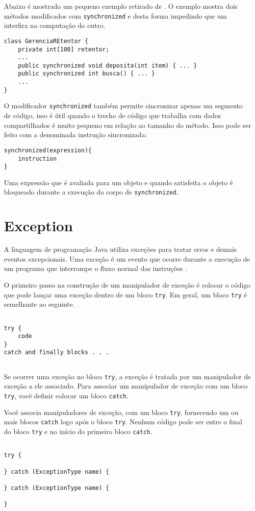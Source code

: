 Abaixo é mostrado um pequeno exemplo retirado de \cite{sebesta}. O exemplo
mostra dois métodos modificados com \texttt{synchronized} e desta forma
impedindo que um interfira na computação do outro.

\begin{lstlisting}
class GerenciaREtentor {
    private int[100] retentor;
    ...
    public synchronized void deposita(int item) { ... }
    public synchronized int busca() { ... }
    ...
}
\end{lstlisting}

O modificador \texttt{synchronized} também permite sincronizar apenas um
segmento de código, isso é útil quando o trecho de código que trabalha com
dados compartilhados é muito pequeno em relação ao tamanho do método. Isso
pode ser feito com a denominada instrução sincronizada:

\begin{lstlisting}
synchronized(expression){
    instruction
}
\end{lstlisting}

Uma expressão que é avaliada para um objeto e quando
satisfeita o objeto é bloqueado durante a execução do corpo de
\texttt{synchronized}.

\section{Exception}

A linguagem de programação Java utiliza exceções para tratar erros e
demais eventos excepcionais. Uma exceção é um evento que ocorre durante
a execução de um programa que interrompe o fluxo normal das instruções
\cite{except}.

O primeiro passo na construção de um manipulador de exceção é colocar
o código que pode lançar uma exceção dentro de um bloco \texttt{try}. Em geral,
um bloco \texttt{try} é semelhante ao seguinte.

\begin{lstlisting}

try {
    code
}
catch and finally blocks . . .
    
\end{lstlisting}


Se ocorrer uma exceção no bloco \texttt{try}, a exceção é tratada por um
manipulador de exceção a ele associado. Para associar um manipulador de
exceção com um bloco \texttt{try}, você definir colocar um bloco
\texttt{catch}.

Você associa manipuladores de exceção, com um bloco \texttt{try}, fornecendo
um ou mais blocos \texttt{catch} logo após o bloco \texttt{try}. Nenhum
código pode ser entre o final do bloco \texttt{try} e no início do primeiro bloco %
\texttt{catch}.

\begin{lstlisting}

try {
     
} catch (ExceptionType name) {
     
} catch (ExceptionType name) {
     
}  

\end{lstlisting}

